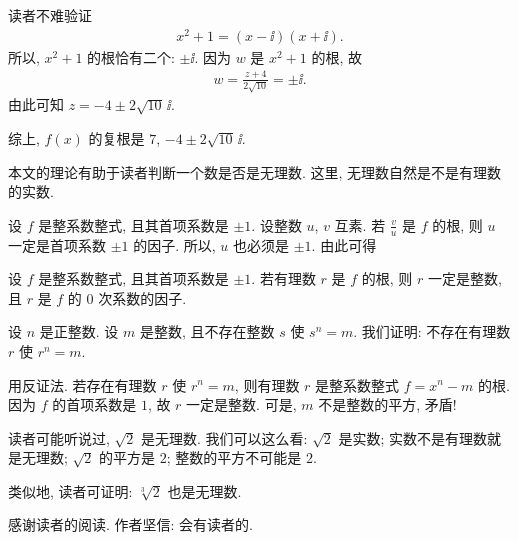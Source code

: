 \begin{example}
    读者不难验证
    \begin{align*}
        x^2 + 1 = (x - \ii) (x + \ii).
    \end{align*}
    所以, $x^2 + 1$ 的根恰有二个: $\pm \ii$. 因为 $w$ 是 $x^2 + 1$ 的根, 故
    \begin{align*}
        w = \frac{z + 4}{2\sqrt{10}} = \pm \ii.
    \end{align*}
    由此可知 $z = -4 \pm 2\sqrt{10}\,\ii$.

    综上, $f(x)$ 的复根是 $7$, $-4 \pm 2\sqrt{10}\,\ii$.
\end{example}

\myLine

本文的理论有助于读者判断一个数是否是无理数. 这里, 无理数自然是不是有理数的实数.

设 $f$ 是整系数整式, 且其首项系数是 $\pm 1$. 设整数 $u$, $v$ 互素. 若 $\frac{v}{u}$ 是 $f$ 的根, 则 $u$ 一定是首项系数 $\pm 1$ 的因子. 所以, $u$ 也必须是 $\pm 1$. 由此可得
\begin{proposition}
    设 $f$ 是整系数整式, 且其首项系数是 $\pm 1$. 若有理数 $r$ 是 $f$ 的根, 则 $r$ 一定是整数, 且 $r$ 是 $f$ 的 $0$ 次系数的因子.
\end{proposition}

\begin{example}
    设 $n$ 是正整数. 设 $m$ 是整数, 且不存在整数 $s$ 使 $s^n = m$. 我们证明: 不存在有理数 $r$ 使 $r^n = m$.

    用反证法. 若存在有理数 $r$ 使 $r^n = m$, 则有理数 $r$ 是整系数整式 $f = x^n - m$ 的根. 因为 $f$ 的首项系数是 $1$, 故 $r$ 一定是整数. 可是, $m$ 不是整数的平方, 矛盾!

    读者可能听说过, $\sqrt{2}$ 是无理数. 我们可以这么看: $\sqrt{2}$ 是实数; 实数不是有理数就是无理数; $\sqrt{2}$ 的平方是 $2$; 整数的平方不可能是 $2$.

    类似地, 读者可证明: $\sqrt[3]{2}$ 也是无理数.
\end{example}

感谢读者的阅读. 作者坚信: 会有读者的.
